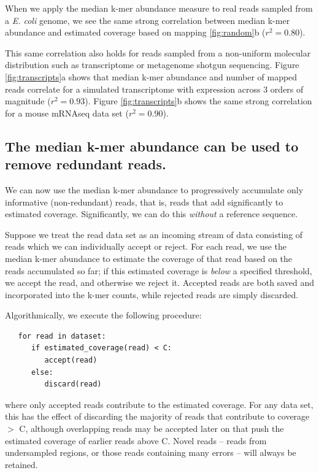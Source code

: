 \documentclass[10pt]{article}
\begin{document}
When we apply the median k-mer abundance measure to real reads sampled
from a {\em E. coli} genome, we see the same strong correlation
between median k-mer abundance and estimated coverage based on mapping
\ref{fig:random}b ($r^2=0.80$).

This same correlation also holds for reads sampled from a non-uniform
molecular distribution such as transcriptome or metagenome shotgun
sequencing.  Figure \ref{fig:transcripts}a shows that median k-mer
abundance and number of mapped reads correlate for a simulated
transcriptome with expression across 3 orders of magnitude ($r^2 =
0.93$).  Figure \ref{fig:transcripts}b shows the same strong
correlation for a mouse mRNAseq data set ($r^2 = 0.90$).

\subsection*{The median k-mer abundance can be used to remove redundant reads.}

We can now use the median k-mer abundance to progressively accumulate
only informative (non-redundant) reads, that is, reads that add
significantly to estimated coverage.  Significantly, we can do this
{\em without} a reference sequence.

Suppose we treat the read data set as an incoming stream of data
consisting of reads which we can individually accept or reject.  For
each read, we use the median k-mer abundance to estimate the coverage
of that read based on the reads accumulated so far; if this estimated
coverage is {\em below} a specified threshold, we accept the read, and
otherwise we reject it.  Accepted reads are both saved and
incorporated into the k-mer counts, while rejected reads are simply
discarded.

Algorithmically, we execute the following procedure:

\begin{verbatim}
   for read in dataset:
      if estimated_coverage(read) < C:
         accept(read)
      else:
         discard(read)
\end{verbatim}

where only accepted reads contribute to the estimated coverage.  For
any data set, this has the effect of discarding the majority of reads
that contribute to coverage $>$ C, although overlapping reads may be
accepted later on that push the estimated coverage of earlier reads
above C.  Novel reads -- reads from undersampled regions, or those
reads containing many errors -- will always be retained.
\end{document}
